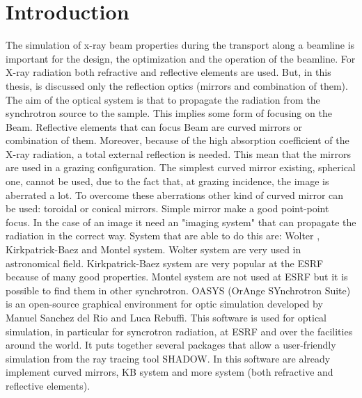 %
%
\cleardoublepage
%
%
%
\chapter*{Introduction}
%
%
\label{cap:introduzione}
%
%
The simulation of x-ray beam properties during the transport along a beamline is important for the design, the optimization and the operation of the beamline. For X-ray radiation both refractive and reflective elements are used. But, in this thesis, is discussed only the reflection optics (mirrors and combination of them). The aim of the optical system is that to propagate the radiation from the synchrotron source to the sample. This implies some form of focusing on the Beam.
\newline
Reflective elements that can focus Beam are curved mirrors or combination of them. Moreover, because of the high absorption coefficient of the X-ray radiation, a total external reflection is needed. This mean that the mirrors are used in a grazing configuration. 
\newline
The simplest curved mirror existing, spherical one, cannot be used, due to the fact that, at grazing incidence, the image is aberrated a lot. To overcome these aberrations other kind of curved mirror can be used: toroidal or conical mirrors. Simple mirror make a good point-point focus. In the case of an image it need an "imaging system" that can propagate the radiation in the correct way. System that are able to do this are: Wolter \cite{wolter1975mirror}, Kirkpatrick-Baez \cite{kirkpatrick1948formation} and Montel \cite{montel1957x} system.
\newline
Wolter system are very used in astronomical field. Kirkpatrick-Baez system are very popular at the ESRF because of many good properties. Montel system are not used at ESRF but it is possible to find them in other synchrotron.
\newline
OASYS (OrAnge SYnchrotron Suite) \cite{rebuffi2017oasys} \cite{del2014proposal} is an open-source graphical environment for optic simulation developed by Manuel Sanchez del Rio and Luca Rebuffi. This software is used for optical simulation, in particular for syncrotron radiation, at ESRF and over the facilities around the world. It puts together several packages that allow a user-friendly simulation  from the ray tracing tool SHADOW. In this software are already implement curved mirrors, KB system and more system (both refractive and reflective elements).
